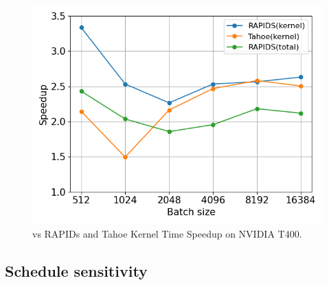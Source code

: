 \begin{figure}[htb]
  \centering
  \includegraphics[width=0.75\linewidth]{figures/geomean_speedup_T400_kernel_time.png}
  \caption{\Treebeard{} vs RAPIDs and Tahoe Kernel Time Speedup on NVIDIA T400.}
  \label{Fig:TBvsRAPIDsTahoe_T400_Speedup}
\end{figure}



\subsection{Schedule sensitivity}
